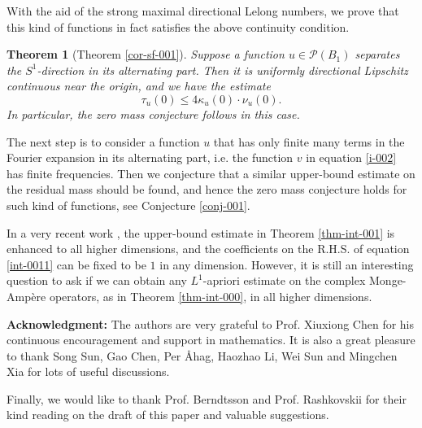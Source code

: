 \documentclass[a4paper,11pt]{amsart}
\numberwithin{equation}{section}
\newtheorem{theorem}{Theorem}[section]
\def\cP{{\mathcal P}}
\def\cP{{\mathcal P}}
\def\k{{\kappa}}
\begin{document}
With the aid of the strong maximal directional Lelong numbers, 
we prove that this kind of functions in fact satisfies the above continuity condition. 




\begin{theorem}[Theorem \ref{cor-sf-001}]
Suppose a function $u\in \cP(B_1)$ separates the $S^1$-direction in its alternating part. 
Then it is uniformly directional Lipschitz continuous near the origin, 
and we have the estimate
$$  \tau_u(0) \leq 4 \k_u(0)\cdot \nu_u(0).  $$
In particular, the zero mass conjecture follows in this case. 
\end{theorem}

The next step is to consider a function $u$ 
that has only finite many terms in the Fourier expansion in its alternating part, 
i.e. the function $v$ in equation \eqref{i-002} has finite frequencies. 
Then we conjecture that a similar upper-bound estimate on the residual mass should be found,  
and hence the zero mass conjecture holds for such kind of functions,
see Conjecture \ref{conj-001}. 



In a very recent work \cite{DLLWZ}, 
the upper-bound estimate in Theorem \ref{thm-int-001}
is enhanced to all higher dimensions, 
and the coefficients on the R.H.S. of equation \eqref{int-0011}
can be fixed to be $1$ in any dimension. 
However, 
it is still an interesting question to ask 
if we can obtain any $L^1$-apriori estimate on the complex Monge-Amp\`ere operators, 
as in Theorem \ref{thm-int-000}, in all higher dimensions. 


\bigskip 

\textbf{Acknowledgment: }
The authors are very grateful to Prof. Xiuxiong Chen for his continuous encouragement and support 
in mathematics. It is also a great pleasure to thank 
Song Sun, Gao Chen, Per \AA hag, Haozhao Li, Wei Sun and Mingchen Xia for lots of useful discussions. 

Finally, we would like to thank 
Prof. Berndtsson and Prof. Rashkovskii for their kind reading on the draft of this paper and valuable suggestions. 
\end{document}
